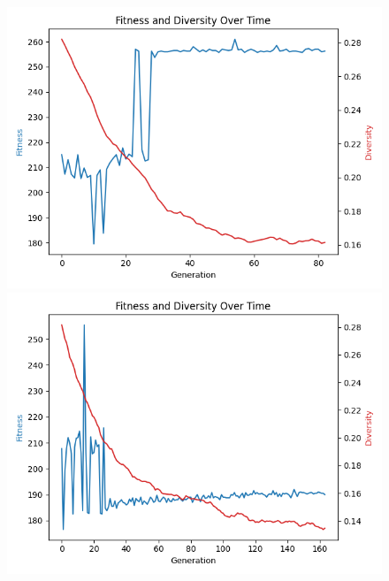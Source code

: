 \documentclass[11pt]{scrartcl} %
\begin{document}
\begin{figure}[H]
    \centering
    \begin{minipage}{0.45\textwidth}
        \centering
        \includegraphics[width=\linewidth]{Figures/part_2/good_samaritan/plot_2025-03-11 19-31-27_0.png}
    \end{minipage}\hfill
    \begin{minipage}{0.45\textwidth}
        \centering
        \includegraphics[width=\linewidth]{Figures/part_2/good_samaritan/plot_2025-03-11 19-31-27_1.png}
    \end{minipage}
    \begin{minipage}{0.45\textwidth}
        \centering

\end{minipage}
\end{figure}
\end{document}
